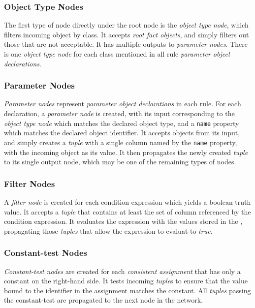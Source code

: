 \documentclass[10pt,twocolumn,letterpaper,colorhighlight]{article}
\begin{document}
\subsubsection{Object Type Nodes}

The first type of node directly under the root node is the 
\emph{object type node}, which filters incoming object 
by class.  It accepts \emph{root fact objects}, and 
simply filters out those that are not acceptable.  It has 
multiple outputs to \emph{parameter nodes}.  There is
one \emph{object type node} for each class mentioned 
in all rule \emph{parameter object declarations}.

\subsubsection{Parameter Nodes}

\emph{Parameter nodes} represent \emph{parameter object
declarations} in each rule.  For each declaration, a
\emph{parameter node} is created, with its input corresponding
to the \emph{object type node} which matches the declared
object type, and a \verb|name| property which matches the
declared object identifier.  It accepts objects from its
input, and simply creates a \emph{tuple} with a single
column named by the \verb|name| property, with the incoming
object as its value. It then propagates the newly created
\emph{tuple} to its single output node, which may be one
of the remaining types of nodes.

\subsubsection{Filter Nodes}

A \emph{filter node} is created for each condition expression
which yields a boolean truth value. It accepts a \emph{tuple} that 
contains at least the set of column referenced by the condition expression.
It evaluates the expression with the values stored in the
, propagating those \emph{tuples} that allow the
expression to evaluat to \emph{true}.

\subsubsection{Constant-test Nodes}

\emph{Constant-test nodes} are created for each \emph{consistent
assignment} that has only a constant on the right-hand side. It tests
incoming \emph{tuple}s to ensure that the value bound to the identifier
in the assignment matches the constant.  All \emph{tuples} passing
the constant-test are propagated to the next node in the network.
\end{document}
